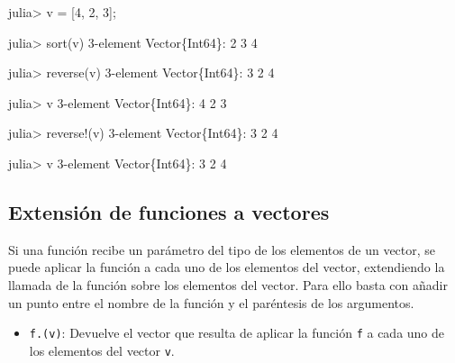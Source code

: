 \documentclass[
  letterpaper,
  DIV=11,
  numbers=noendperiod]{scrreprt}
\newenvironment{Shaded}{\begin{snugshade}}{\end{snugshade}}
\newcommand{\DataTypeTok}[1]{\textcolor[rgb]{0.68,0.00,0.00}{#1}}
\newcommand{\FloatTok}[1]{\textcolor[rgb]{0.68,0.00,0.00}{#1}}
\newcommand{\FunctionTok}[1]{\textcolor[rgb]{0.28,0.35,0.67}{#1}}
\newcommand{\NormalTok}[1]{\textcolor[rgb]{0.00,0.23,0.31}{#1}}
\newcommand{\OperatorTok}[1]{\textcolor[rgb]{0.37,0.37,0.37}{#1}}
\providecommand{\tightlist}{%
  \setlength{\itemsep}{0pt}\setlength{\parskip}{0pt}}\usepackage{longtable,booktabs,array}
\begin{document}
\begin{Shaded}
\begin{Highlighting}[]
\NormalTok{julia}\OperatorTok{\textgreater{}}\NormalTok{ v }\OperatorTok{=}\NormalTok{ [}\FloatTok{4}\NormalTok{, }\FloatTok{2}\NormalTok{, }\FloatTok{3}\NormalTok{];}

\NormalTok{julia}\OperatorTok{\textgreater{}} \FunctionTok{sort}\NormalTok{(v)}
\FloatTok{3}\OperatorTok{{-}}\NormalTok{element }\DataTypeTok{Vector}\NormalTok{\{}\DataTypeTok{Int64}\NormalTok{\}}\OperatorTok{:}
 \FloatTok{2}
 \FloatTok{3}
 \FloatTok{4}

\NormalTok{julia}\OperatorTok{\textgreater{}} \FunctionTok{reverse}\NormalTok{(v)}
\FloatTok{3}\OperatorTok{{-}}\NormalTok{element }\DataTypeTok{Vector}\NormalTok{\{}\DataTypeTok{Int64}\NormalTok{\}}\OperatorTok{:}
 \FloatTok{3}
 \FloatTok{2}
 \FloatTok{4}

\NormalTok{julia}\OperatorTok{\textgreater{}}\NormalTok{ v}
\FloatTok{3}\OperatorTok{{-}}\NormalTok{element }\DataTypeTok{Vector}\NormalTok{\{}\DataTypeTok{Int64}\NormalTok{\}}\OperatorTok{:}
 \FloatTok{4}
 \FloatTok{2}
 \FloatTok{3}

\NormalTok{julia}\OperatorTok{\textgreater{}} \FunctionTok{reverse!}\NormalTok{(v)}
\FloatTok{3}\OperatorTok{{-}}\NormalTok{element }\DataTypeTok{Vector}\NormalTok{\{}\DataTypeTok{Int64}\NormalTok{\}}\OperatorTok{:}
 \FloatTok{3}
 \FloatTok{2}
 \FloatTok{4}

\NormalTok{julia}\OperatorTok{\textgreater{}}\NormalTok{ v}
\FloatTok{3}\OperatorTok{{-}}\NormalTok{element }\DataTypeTok{Vector}\NormalTok{\{}\DataTypeTok{Int64}\NormalTok{\}}\OperatorTok{:}
 \FloatTok{3}
 \FloatTok{2}
 \FloatTok{4}
\end{Highlighting}
\end{Shaded}

\hypertarget{extensiuxf3n-de-funciones-a-vectores}{%
\subsection{Extensión de funciones a
vectores}\label{extensiuxf3n-de-funciones-a-vectores}}

Si una función recibe un parámetro del tipo de los elementos de un
vector, se puede aplicar la función a cada uno de los elementos del
vector, extendiendo la llamada de la función sobre los elementos del
vector. Para ello basta con añadir un punto entre el nombre de la
función y el paréntesis de los argumentos.

\begin{itemize}
\tightlist
\item
  \texttt{f.(v)}: Devuelve el vector que resulta de aplicar la función
  \texttt{f} a cada uno de los elementos del vector \texttt{v}.
\end{itemize}
\end{document}
